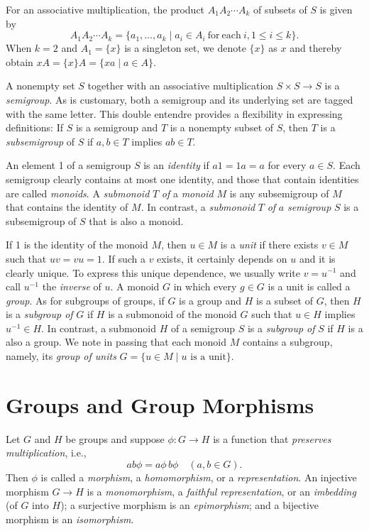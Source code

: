 \documentclass{surv-l}
\numberwithin{equation}{section}
\numberwithin{table}{section}
\numberwithin{figure}{section}
\theoremstyle{definition}
\begin{document}
For an associative multiplication, the product $A_{1}A_{2}\cdots
A_{k}$ of subsets of $S$ is given by
\[
A_{1}A_{2}\cdots A_{k}=\{a_{1},\ldots, a_{k}\mid a_{i}\in A_{i}\ \mathrm{for\
each}\ i, 1\leq i\leq k\}.
\]
When $k=2$ and $A_{1}=\{x\}$ is a singleton set, we denote $\{x\}$
as $x$ and thereby obtain $xA=\{x\}A=\{xa\mid a\in A\}$.

A nonempty set $S$ together with an associative multiplication
$S\times S\rightarrow S$ is a \emph{semigroup}. As is customary,
both a semigroup and its underlying set are tagged with the same
letter. This double entendre provides a flexibility in expressing
definitions: If $S$ is a semigroup and $T$ is a nonempty subset of
$S$, then $T$ is a \emph{subsemigroup} of $S$ if $a, b\in T$
implies $ ab\in T$.

An element 1 of a semigroup $S$ is an
\emph{identity} if $a1 = 1a = a$
for every $a\in S$. Each semigroup clearly contains at most one
identity, and those that contain identities are called
\emph{monoids}. A \emph{submonoid} $T$ \emph{of} a
\emph{monoid} $M$ is any subsemigroup of $M$ that contains the
identity of $M$. In contrast, a \emph{submonoid} $T$ \emph{of} $a$
\emph{semigroup} $S$ is a subsemigroup of $S$ that is also a
monoid.

If 1 is the identity of the monoid $M$, then $u\in M$ is a
\emph{unit} if there exists $v\in M$ such that $uv= vu =1$. If
such a $v$ exists, it certainly depends on $u$ and it is clearly
unique. To express this unique dependence, we usually write
$v=u^{-1}$ and call $u^{-1}$ the \emph{inverse} of $u$. A monoid
$G$ in which every $g\in G$ is a unit is called a
\emph{group}. As for subgroups of groups,
if $G$ is a group and $H$ is a subset of $G$, then $H$ is a
\emph{subgroup of} $G$ if $H$ is a submonoid of the monoid $G$
such that $u\in H$ implies $ u^{-1}\in H$. In contrast, a
submonoid $H$ of a semigroup $S$ is a \emph{subgroup of} $S$ if
$H$ is a also a group. We note in
passing that each monoid $M$ contains a subgroup, namely, its
\emph{group of units} $G=\{u\in M\mid
u\text{ is a unit}\}$.

\section{Groups and Group Morphisms}\label{secA.71}

Let $G$ and $H$ be groups and suppose $\phi : G\rightarrow H$ is a
function that \emph{preserves multiplication}, i.e.,
\[
 ab\phi=a\phi\, b\phi\quad (a, b\in G).
\]
Then $\phi$ is called a \emph{morphism}, a
\emph{homomorphism}, or a
\emph{representation}. An injective morphism $G\rightarrow H$ is a
\emph{monomorphism},\index{monomorphism} a \emph{faithful
representation}, or an
\emph{imbedding} (of $G$ into $H$); a surjective
morphism is an \emph{epimorphism}\index{epimorphism}; and a
bijective morphism is an \emph{isomorphism}.
\end{document}
